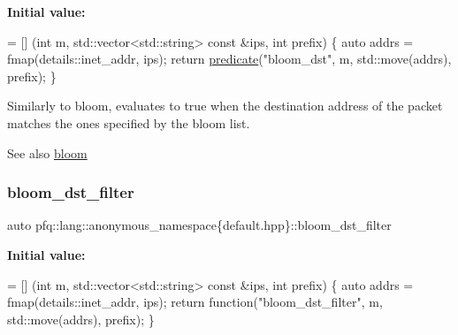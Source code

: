 {\bfseries Initial value\+:}
\begin{DoxyCode}
= [] (\textcolor{keywordtype}{int} m, std::vector<std::string> \textcolor{keyword}{const} &ips, \textcolor{keywordtype}{int} prefix) \{
                                \textcolor{keyword}{auto} addrs = fmap(details::inet\_addr, ips);
                                \textcolor{keywordflow}{return} \hyperlink{namespacepfq_1_1lang_aca9adafc436b7f851621b979fa1aaf88}{predicate}(\textcolor{stringliteral}{"bloom\_dst"}, m, std::move(addrs), prefix);
                          \}
\end{DoxyCode}
Similarly to {\ttfamily bloom}, evaluates to {\ttfamily true} when the destination address of the packet matches the ones specified by the bloom list. \begin{DoxySeeAlso}{See also}
\hyperlink{namespacepfq_1_1lang_1_1anonymous__namespace_02default_8hpp_03_abfcd230137acb93cfd99f7a0a7c1f17f}{bloom} 
\end{DoxySeeAlso}
\mbox{\label{namespacepfq_1_1lang_1_1anonymous__namespace_02default_8hpp_03_a71aa2d21ceb343786b3911801eb0741b}} 
\subsubsection{\texorpdfstring{bloom\+\_\+dst\+\_\+filter}{bloom\_dst\_filter}}
{\footnotesize\ttfamily auto pfq\+::lang\+::anonymous\+\_\+namespace\{default.\+hpp\}\+::bloom\+\_\+dst\+\_\+filter}

{\bfseries Initial value\+:}
\begin{DoxyCode}
= [] (\textcolor{keywordtype}{int} m, std::vector<std::string> \textcolor{keyword}{const} &ips, \textcolor{keywordtype}{int} prefix) \{
                                    \textcolor{keyword}{auto} addrs = fmap(details::inet\_addr, ips);
                                    \textcolor{keywordflow}{return} \textcolor{keyword}{function}(\textcolor{stringliteral}{"bloom\_dst\_filter"}, m, std::move(addrs), prefix);
                                \}
\end{DoxyCode}


